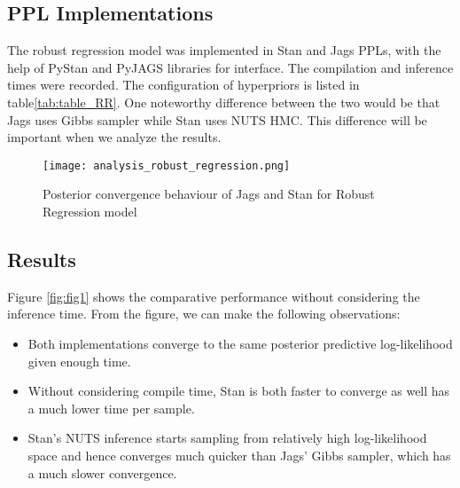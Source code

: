 \documentclass[../main.tex]{subfiles}
\begin{document}
\subsection{PPL Implementations}
The robust regression model was implemented in Stan and Jags PPLs, with the help of PyStan\cite{PyStan} and PyJAGS\cite{PyJAGS} libraries for interface.
The compilation and inference times were recorded.
The configuration of hyperpriors is listed in table\ref{tab:table_RR}.
One noteworthy difference between the two would be that Jags uses Gibbs sampler while Stan uses NUTS HMC.
This difference will be important when we analyze the results.

\begin{figure}[h]
  \centering
  \texttt{[image: analysis\_robust\_regression.png]}
  \caption{Posterior convergence behaviour of Jags and Stan for Robust Regression model}
  \label{fig:fig2}
\end{figure}

\subsection{Results}
Figure \ref{fig:fig1} shows the comparative performance without considering the inference time.
From the figure, we can make the following observations:
\begin{itemize}
\item Both implementations converge to the same posterior predictive log-likelihood given enough time.
\item Without considering compile time, Stan is both faster to converge as well has a much lower time per sample.
\item Stan’s NUTS inference starts sampling from relatively high log-likelihood space  and hence converges much quicker than Jags’ Gibbs sampler, which has a much slower convergence.
\end{itemize}
\end{document}
